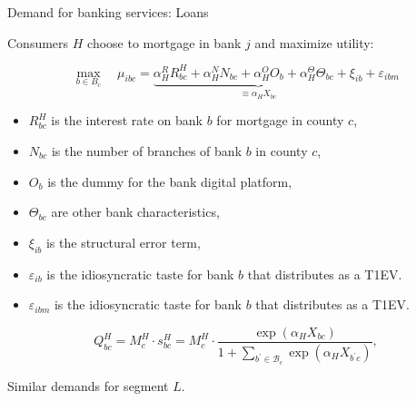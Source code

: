 \documentclass[notes,10pt, aspectratio=169]{beamer}
\newenvironment{wideitemize}{\itemize\addtolength{\itemsep}{10pt}}{\enditemize}
\begin{document}
    \begin{frame}{ Demand for banking services: Loans}

        \begin{wideitemize}
    
            \item Consumers $H$ choose to mortgage in bank $j$ and maximize utility:
            
            $$
            \max _{b \in B_c} \quad \mu_{i b c}=\underbrace{\alpha_H^R R_{b c}^H+\alpha_H^N N_{b c}+\alpha_H^O O_b+\alpha_H^{\Theta} \Theta_{b c}+\xi_{i b}}_{\equiv \alpha_H X_{b c}}+\varepsilon_{i b m}
            $$
    
            \begin{itemize}
                \item $R_{b c}^H$ is the interest rate on bank $b$ for mortgage in county $c$,
                \item $N_{b c}$ is the number of branches of bank $b$ in county $c$,
                \item $O_b$ is the dummy for the bank digital platform,
                \item $\Theta_{b c}$ are other bank characteristics,
                \item $\xi_{i b}$ is the structural error term,
                \item $\varepsilon_{i b}$ is the idiosyncratic taste for bank $b$ that distributes as a T1EV.
                \item $\varepsilon_{i b m}$ is the idiosyncratic taste for bank $b$ that distributes as a T1EV.
            \end{itemize}
    
         $$ Q_{b c}^H=M_c^H \cdot s_{b c}^H=M_c^H \cdot \frac{\exp \left(\alpha_H X_{b c}\right)}{1+\sum_{b^{\prime} \in \mathcal{B}_c} \exp \left(\alpha_H X_{b^{\prime} c}\right)},$$
    \item Similar demands for segment $L$.
        \end{wideitemize}
    
    
        \end{frame}


        

\end{document}
